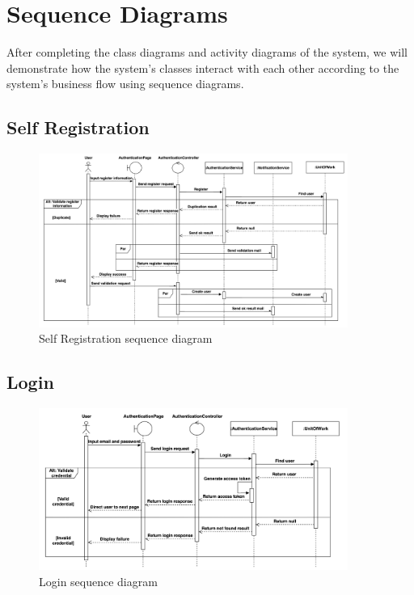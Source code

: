 \section{Sequence Diagrams}

After completing the class diagrams and activity diagrams of the system, we will  demonstrate how the system's classes interact with each other according to the system's business flow using sequence diagrams.

\subsection{Self Registration}

\begin{figure}[H]
    \centering
    \includegraphics[width=0.9\textwidth]{Figures/self_register_seq.png}
    \caption{Self Registration sequence diagram}
    \label{fig:self-registration-seq}
\end{figure}


\subsection{Login}

\begin{figure}[H]
    \centering
    \includegraphics[width=0.9\textwidth]{Figures/login_seq.png}
    \caption{Login sequence diagram}
    \label{fig:login-seq}
\end{figure}
